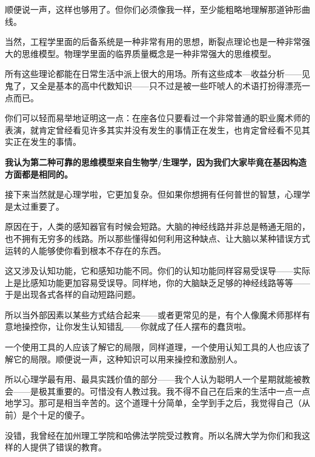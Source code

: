 顺便说一声，这样也够用了。但你们必须像我一样，至少能粗略地理解那道钟形曲线。
\par

当然，工程学里面的后备系统是一种非常有用的思想，断裂点理论也是一种非常强大的思维模型。物理学里面的临界质量概念是一种非常强大的思维模型。
\par

所有这些理论都能在日常生活中派上很大的用场。所有这些成本—收益分析——见鬼了，又全是基本的高中代数知识——只不过是被一些吓唬人的术语打扮得漂亮一点而已。
\par

你们可以轻而易举地证明这一点：在座各位只要看过一个非常普通的职业魔术师的表演，就肯定曾经看见许多其实并没有发生的事情正在发生，也肯定曾经看不见其实正在发生的事情。
\par

\textbf{我认为第二种可靠的思维模型来自生物学/生理学，因为我们大家毕竟在基因构造方面都是相同的。}
\par

接下来当然就是心理学啦，它更加复杂。但如果你想拥有任何普世的智慧，心理学是太过重要了。
\par

原因在于，人类的感知器官有时候会短路。大脑的神经线路并非总是畅通无阻的，也不拥有无穷多的线路。所以那些懂得如何利用这种缺点、让大脑以某种错误方式运转的人能够使你看到根本不存在的东西。
\par

这又涉及认知功能，它和感知功能不同。你们的认知功能同样容易受误导——实际上是比感知功能更加容易受误导。同样地，你的大脑缺乏足够的神经线路等等——于是出现各式各样的自动短路问题。
\par

所以当外部因素以某些方式结合起来——或者更常见的是，有个人像魔术师那样有意地操控你，让你发生认知错乱——你就成了任人摆布的蠢货啦。
\par

一个使用工具的人应该了解它的局限，同样道理，一个使用认知工具的人也应该了解它的局限。顺便说一声，这种知识可以用来操控和激励别人。
\par

所以心理学最有用、最具实践价值的部分——我个人认为聪明人一个星期就能被教会——是极其重要的。可惜没有人教过我。我不得不自己在后来的生活中一点一点地学习。那可是相当辛苦的。这个道理十分简单，全学到手之后，我觉得自己（从前）是个十足的傻子。
\par

没错，我曾经在加州理工学院和哈佛法学院受过教育。所以名牌大学为你们和我这样的人提供了错误的教育。
\par

